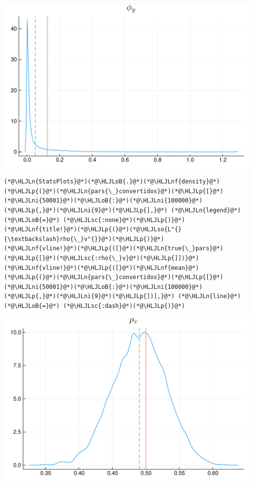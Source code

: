 \documentclass[12pt,a4paper]{article}
\newcommand{\HLJLn}[1]{#1}
\newcommand{\HLJLnf}[1]{\textcolor[RGB]{66,102,213}{#1}}
\newcommand{\HLJLsc}[1]{\textcolor[RGB]{201,61,57}{#1}}
\newcommand{\HLJLso}[1]{\textcolor[RGB]{201,61,57}{#1}}
\newcommand{\HLJLni}[1]{\textcolor[RGB]{59,151,46}{#1}}
\newcommand{\HLJLoB}[1]{\textcolor[RGB]{102,102,102}{\textbf{#1}}}
\newcommand{\HLJLp}[1]{#1}
\begin{document}
\includegraphics[width=\linewidth]{figures/dsge_and_julia_32_1.pdf}

\begin{lstlisting}
(*@\HLJLn{StatsPlots}@*)(*@\HLJLoB{.}@*)(*@\HLJLnf{density}@*)(*@\HLJLp{(}@*)(*@\HLJLn{pars{\_}convertidos}@*)(*@\HLJLp{[}@*)(*@\HLJLni{50001}@*)(*@\HLJLoB{:}@*)(*@\HLJLni{100000}@*)(*@\HLJLp{,}@*)(*@\HLJLni{9}@*)(*@\HLJLp{],}@*) (*@\HLJLn{legend}@*) (*@\HLJLoB{=}@*) (*@\HLJLsc{:none}@*)(*@\HLJLp{)}@*)
(*@\HLJLnf{title!}@*)(*@\HLJLp{(}@*)(*@\HLJLso{L"{}{\textbackslash}rho{\_}v"{}}@*)(*@\HLJLp{)}@*)
(*@\HLJLnf{vline!}@*)(*@\HLJLp{([}@*)(*@\HLJLn{true{\_}pars}@*)(*@\HLJLp{[}@*)(*@\HLJLsc{:rho{\_}v}@*)(*@\HLJLp{]])}@*)
(*@\HLJLnf{vline!}@*)(*@\HLJLp{([}@*)(*@\HLJLnf{mean}@*)(*@\HLJLp{(}@*)(*@\HLJLn{pars{\_}convertidos}@*)(*@\HLJLp{[}@*)(*@\HLJLni{50001}@*)(*@\HLJLoB{:}@*)(*@\HLJLni{100000}@*)(*@\HLJLp{,}@*)(*@\HLJLni{9}@*)(*@\HLJLp{])],}@*) (*@\HLJLn{line}@*) (*@\HLJLoB{=}@*) (*@\HLJLsc{:dash}@*)(*@\HLJLp{)}@*)
\end{lstlisting}

\includegraphics[width=\linewidth]{figures/dsge_and_julia_33_1.pdf}
\end{document}
